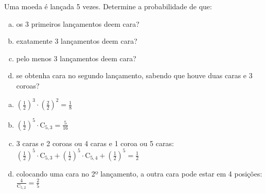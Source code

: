 \begin{ex}
Uma moeda é lançada 5 vezes. Determine a probabilidade de que:
   \begin{enumerate}[(a)]
   \item os 3 primeiros lançamentos deem cara?
   \item exatamente 3 lançamentos deem cara?
   \item pelo menos 3 lançamentos deem cara?
   \item se obtenha cara no segundo lançamento, sabendo que houve duas caras e 3 coroas?
   \end{enumerate}
     \begin{sol}
       \phantom{A} 
        \begin{enumerate} [(a)]
            \item $(\frac{1}{2})^3\cdot(\frac{2}{2})^2=\frac{1}{8}$
            \item $(\frac{1}{2})^5\cdot\mathrm{C}_{5,3}=\frac{5}{16}$
            \item 3 caras e 2 coroas ou 4 caras e 1 coroa ou 5 caras:\\
            $(\frac{1}{2})^5\cdot\mathrm{C}_{5,3}+(\frac{1}{2})^5\cdot\mathrm{C}_{5,4}+(\frac{1}{2})^5=\frac{1}{2}$
            \item colocando uma cara no 2º lançamento, a outra cara pode estar em 4 posições: $\frac{4}{\mathrm{C}_{5,2}}=\frac{2}{5}$
        \end{enumerate}
     \end{sol}
   
\end{ex}
